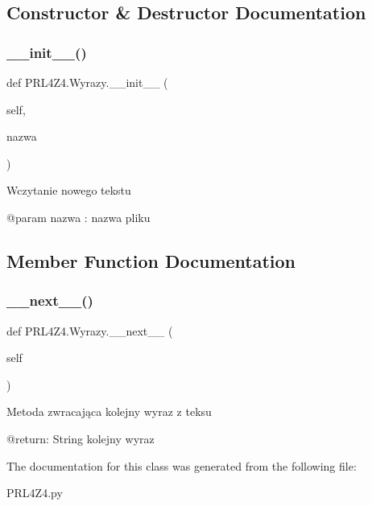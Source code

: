 \subsection{Constructor \& Destructor Documentation}
\mbox{\label{classPRL4Z4_1_1Wyrazy_a10f2c7a864d54996a6858735a84f49e2}} 
\subsubsection{\texorpdfstring{\+\_\+\+\_\+init\+\_\+\+\_\+()}{\_\_init\_\_()}}
{\footnotesize\ttfamily def P\+R\+L4\+Z4.\+Wyrazy.\+\_\+\+\_\+init\+\_\+\+\_\+ (\begin{DoxyParamCaption}\item[{}]{self,  }\item[{}]{nazwa }\end{DoxyParamCaption})}

\begin{DoxyVerb}Wczytanie nowego tekstu

@param nazwa : nazwa pliku
\end{DoxyVerb}
 

\subsection{Member Function Documentation}
\mbox{\label{classPRL4Z4_1_1Wyrazy_aaf47c6c4b074f1c1c0ca8402f93f7d82}} 
\subsubsection{\texorpdfstring{\+\_\+\+\_\+next\+\_\+\+\_\+()}{\_\_next\_\_()}}
{\footnotesize\ttfamily def P\+R\+L4\+Z4.\+Wyrazy.\+\_\+\+\_\+next\+\_\+\+\_\+ (\begin{DoxyParamCaption}\item[{}]{self }\end{DoxyParamCaption})}

\begin{DoxyVerb}Metoda zwracająca kolejny wyraz z teksu

@return: String kolejny wyraz
\end{DoxyVerb}
 

The documentation for this class was generated from the following file\+:\begin{DoxyCompactItemize}
\item 
P\+R\+L4\+Z4.\+py\end{DoxyCompactItemize}
